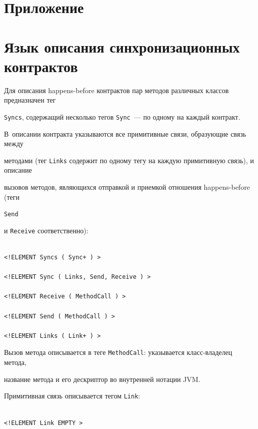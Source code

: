  {\small



 \section*{\raggedleft Приложение}



 \section*{Язык описания синхронизационных контрактов}





  Для описания happens-before контрактов пар методов различных классов предназначен тег

\verb"Syncs", содержащий несколько тегов \verb"Sync"~--- по одному на каждый контракт.

В~описании контракта указываются все примитивные связи, образующие связь между

методами (тег \verb"Links" содержит по одному тегу на каждую примитивную связь), и описание

вызовов методов, являющихся отправкой и приемкой отношения happens-before (теги

\verb"Send"

и \verb"Receive" соответственно):

  \begin{verbatim}

<!ELEMENT Syncs ( Sync+ ) >

<!ELEMENT Sync ( Links, Send, Receive ) >

<!ELEMENT Receive ( MethodCall ) >

<!ELEMENT Send ( MethodCall ) >

<!ELEMENT Links ( Link+ ) >

\end{verbatim}



  Вызов метода описывается в теге \verb"MethodCall": указывается класс-вла\-де\-лец метода,

название метода и его дескриптор во внутренней нотации JVM.



  Примитивная связь описывается тегом \verb"Link":

  \begin{verbatim}

<!ELEMENT Link EMPTY >


\end{verbatim}}
